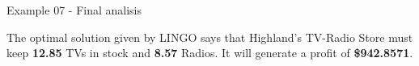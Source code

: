 \begin{frame}{Example 07 - Final analisis}

The optimal solution given by LINGO says that Highland's TV-Radio Store must keep
\textbf{12.85} TVs in stock and \textbf{8.57} Radios. It will generate a profit
of \textbf{\$942.8571}.

\end{frame}
